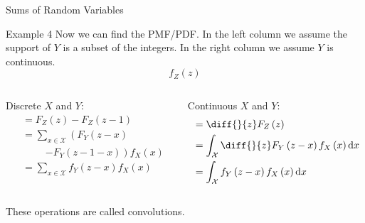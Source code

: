 \documentclass[10pt]{beamer}
\begin{document}
\begin{frame}[fragile]{Sums of Random Variables}
\begin{exampleblock}{Example 4}
Now we can find the PMF/PDF. In the left column we assume the support of \(Y\) is a subset of the integers. In the right column we assume \(Y\) is continuous.
\begin{equation*}
    f_Z\left(z\right)
\end{equation*}
\begin{columns}[t]
\begin{column}{0.425\textwidth}
Discrete \(X\) and \(Y\):
\begin{equation*}
\begin{aligned}
    &= F_Z\left(z\right) - F_Z\left(z - 1\right)\\
    &= \sum_{x\in\mathcal{X}}\left(F_Y\left(z - x\right)\right.\\
    &\phantom{=}\quad \left.- F_Y\left(z - 1 - x\right)\right)f_X\left(x\right)\\
    &= \sum_{x\in\mathcal{X}}f_Y\left(z - x\right)f_X\left(x\right)
\end{aligned}
\end{equation*}
\end{column}
\begin{column}{0.425\textwidth}
Continuous \(X\) and \(Y\):
\begin{equation*}
\begin{aligned}
    &= \diff{}{z}F_Z\left(z\right)\\
    &= \int_{\mathcal{X}}\diff{}{z}F_Y\left(z - x\right)f_X\left(x\right)\mathrm{d}x\\
    &= \int_{\mathcal{X}}f_Y\left(z - x\right)f_X\left(x\right)\mathrm{d}x
\end{aligned}
\end{equation*}
\end{column}
\end{columns}

These operations are called convolutions.
\end{exampleblock}
\end{frame}
\end{document}
